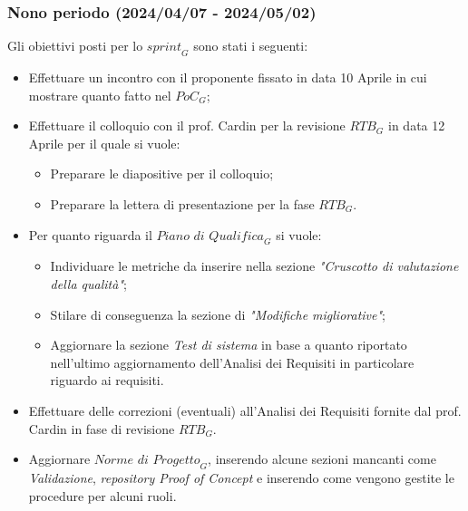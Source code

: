 \subsubsection{Nono periodo (2024/04/07 - 2024/05/02)}
Gli obiettivi posti per lo $\textit{sprint}_G$ sono stati i seguenti:
\begin{itemize}
    \item Effettuare un incontro con il proponente fissato in data 10 Aprile in cui mostrare quanto fatto nel $\textit{PoC}_G$;
    \item Effettuare il colloquio con il prof. Cardin per la revisione $\textit{RTB}_G$ in data 12 Aprile per il quale si vuole:
    \begin{itemize}
        \item Preparare le diapositive per il colloquio;
        \item Preparare la lettera di presentazione per la fase $\textit{RTB}_G$.
    \end{itemize}
    \item Per quanto riguarda il $\textit{Piano di Qualifica}_G$ si vuole:
    \begin{itemize}
        \item Individuare le metriche da inserire nella sezione \emph{"Cruscotto di valutazione della qualità"};
        \item Stilare di conseguenza la sezione di \emph{"Modifiche migliorative"};
        \item Aggiornare la sezione \emph{Test di sistema} in base a quanto riportato nell'ultimo aggiornamento dell'Analisi dei Requisiti in particolare riguardo ai requisiti.
    \end{itemize}
    \item Effettuare delle correzioni (eventuali) all'Analisi dei Requisiti fornite dal prof. Cardin in fase di revisione $\textit{RTB}_G$.
    \item Aggiornare $\textit{Norme di Progetto}_G$, inserendo alcune sezioni mancanti come \emph{Validazione}, \emph{repository Proof of Concept} e inserendo come vengono gestite le procedure per alcuni ruoli.
\end{itemize}
